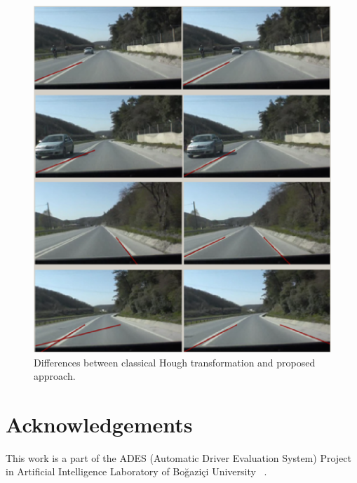 \documentclass[a4paper,oneside,10pt]{article}
\begin{document}
\begin{figure}
\begin{center}
\includegraphics[scale=0.5]{fig4}
\end{center}
\caption{Differences between classical Hough transformation and proposed approach.}
\label{aba:fig4}
\end{figure}

\section{Acknowledgements}
This work is a part of the ADES (Automatic Driver Evaluation System) Project in Artificial Intelligence Laboratory of Bo{\u g}azi{\c c}i University ~\cite{ades09}.


	
\end{document}
